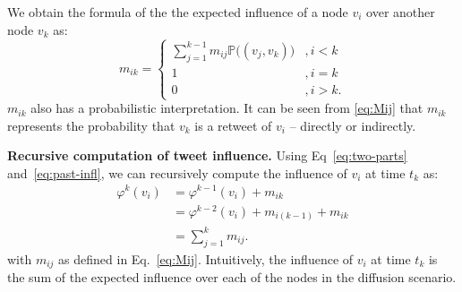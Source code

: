 We obtain the formula of the the expected influence of a node $v_i$ over another node $v_k$ as:
%
\begin{equation} \label{eq:Mij}
m_{ik}=
\left\{
\begin{array}{ll}
	\sum^{k-1}_{j=1}m_{ij}\mathds{P}\big((v_j, v_k)\big) &,i < k \\
	1 & ,i = k \\
	0 & ,i > k.
\end{array}
\right.
\end{equation}
$m_{ik}$ also has a probabilistic interpretation.
It can be seen from \cref{eq:Mij} that $m_{ik}$ represents the probability that $v_k$ is a retweet of $v_i$ -- directly or indirectly.

\textbf{Recursive computation of tweet influence.}
Using Eq~\eqref{eq:two-parts} and~\eqref{eq:past-infl}, we can recursively compute the influence of $v_i$ at time $t_k$ as:
\begin{align}
	\varphi^k(v_i) &= \varphi^{k-1}(v_i) + m_{ik} \nonumber \\
				   &= \varphi^{k-2}(v_i) + m_{i(k-1)} + m_{ik} \nonumber \\
				   &= \sum_{j=1}^k m_{ij}.
\end{align}
with $m_{ij}$ as defined in Eq.~\eqref{eq:Mij}.
Intuitively, the influence of $v_i$ at time $t_k$ is the sum of the expected influence over each of the nodes in the diffusion scenario.

